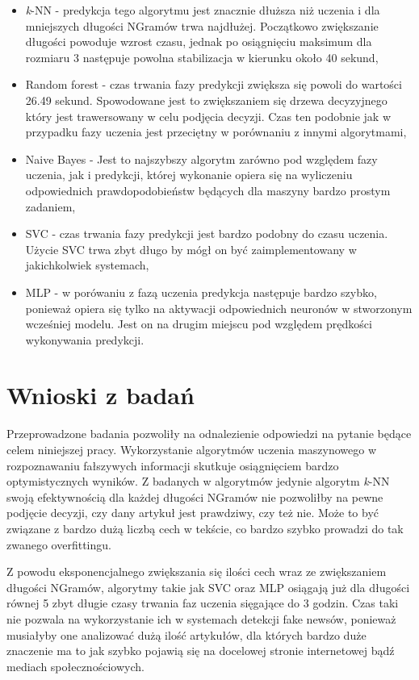 \begin{itemize}
    \begin{itemize}
        \item \textit{k}-NN -
        predykcja tego algorytmu jest znacznie dłuższa niż uczenia i dla mniejszych długości NGramów trwa
        najdłużej. Początkowo zwiększanie długości powoduje wzrost czasu, jednak po osiągnięciu maksimum dla rozmiaru 3
        następuje powolna stabilizacja w kierunku około 40 sekund,
        \item Random forest -
        czas trwania fazy predykcji zwiększa się powoli do wartości 26.49 sekund. Spowodowane jest to zwiększaniem
        się drzewa decyzyjnego który jest trawersowany w celu podjęcia decyzji. Czas ten podobnie jak w przypadku 
        fazy uczenia jest przeciętny w porównaniu z innymi algorytmami,
        \item Naive Bayes -
        Jest to najszybszy algorytm zarówno pod względem fazy uczenia, jak i predykcji, której wykonanie 
        opiera się na wyliczeniu odpowiednich prawdopodobieństw będących dla maszyny bardzo prostym zadaniem,
        \item SVC -
        czas trwania fazy predykcji jest bardzo podobny do czasu uczenia. Użycie SVC trwa zbyt długo
        by mógł on być zaimplementowany w jakichkolwiek systemach,
        \item MLP -
        w porówaniu z fazą uczenia predykcja następuje bardzo szybko, ponieważ opiera się tylko
        na aktywacji odpowiednich neuronów w stworzonym wcześniej modelu. Jest on na drugim miejscu
        pod względem prędkości wykonywania predykcji.
    \end{itemize}
\end{itemize}




\section{Wnioski z badań}
Przeprowadzone badania pozwoliły na odnalezienie odpowiedzi na pytanie 
będące celem niniejszej pracy. Wykorzystanie algorytmów uczenia maszynowego 
w rozpoznawaniu fałszywych informacji skutkuje osiągnięciem bardzo optymistycznych wyników.
Z badanych w algorytmów jedynie algorytm \textit{k}-NN swoją efektywnością dla 
każdej długości NGramów nie pozwoliłby na pewne podjęcie decyzji, czy dany artykuł jest prawdziwy, czy też nie.
Może to być związane z bardzo dużą liczbą cech w tekście, co bardzo szybko prowadzi do tak zwanego 
overfittingu. 

Z powodu eksponencjalnego zwiększania się ilości cech wraz ze zwiększaniem długości NGramów, 
algorytmy takie jak SVC oraz MLP osiągają już dla długości równej 5 zbyt długie czasy trwania faz uczenia sięgające 
do 3 godzin. Czas taki nie pozwala na wykorzystanie ich w systemach detekcji fake newsów, ponieważ
musiałyby one analizować dużą ilość artykułów, dla których bardzo duże znaczenie ma to jak 
szybko pojawią się na docelowej stronie internetowej bądź mediach społecznościowych.

